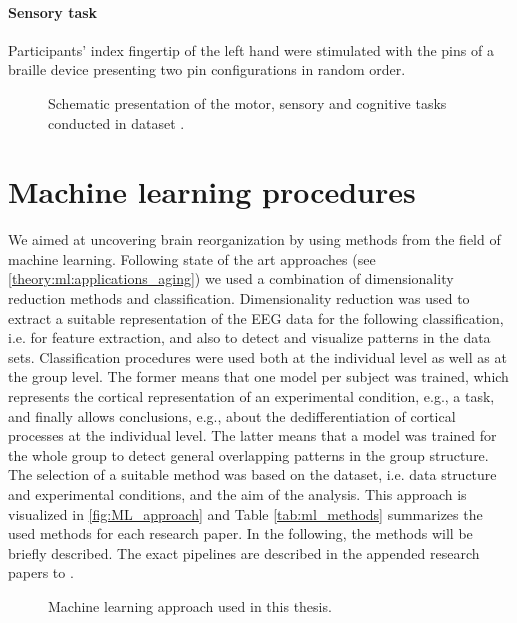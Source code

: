 \paragraph{Sensory task}
Participants' index fingertip of the left hand were stimulated with the pins of a braille device presenting two pin configurations in random order. 

\begin{figure}[h]
\begin{center}

\caption[Schematic presentation of the motor, sensory and cognitive tasks conducted in dataset .]{Schematic presentation of the motor, sensory and cognitive tasks conducted in dataset .}
\label{fig:DSII_exp3}
\end{center}
\end{figure}

\section{Machine learning procedures} 
We aimed at uncovering brain reorganization by using methods from the field of machine learning. Following state of the art approaches (see \autoref{theory:ml:applications_aging}) we used a combination of dimensionality reduction methods and classification. Dimensionality reduction was used to extract a suitable representation of the EEG data for the following classification, i.e. for feature extraction, and also to detect and visualize patterns in the data sets. Classification procedures were used both at the individual level as well as at the group level. The former means that one model per subject was trained, which represents the cortical representation of an experimental condition, e.g., a task, and finally allows conclusions, e.g., about the dedifferentiation of cortical processes at the individual level. The latter means that a model was trained for the whole group to detect general overlapping patterns in the group structure. The selection of a suitable method was based on the dataset, i.e. data structure and experimental conditions, and the aim of the analysis. This approach is visualized in \autoref{fig:ML_approach} and Table \autoref{tab:ml_methods}  summarizes the used methods for each research paper. In the following, the methods will be briefly described. The exact pipelines are described in the appended research papers  to .

\begin{figure}[ht]
\begin{center}

\caption[Machine learning approach used in this thesis]{Machine learning approach used in this thesis.}
\label{fig:ML_approach}
\end{center}
\end{figure}

